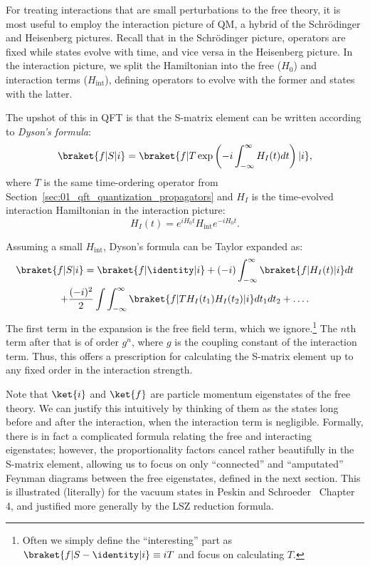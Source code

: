 For treating interactions that are small perturbations to the free theory, it is most useful to employ the interaction picture of QM, a hybrid of the Schr\"odinger and Heisenberg pictures.
Recall that in the Schr\"odinger picture, operators are fixed while states evolve with time, and vice versa in the Heisenberg picture.
In the interaction picture, we split the Hamiltonian into the free ($H_0$) and interaction terms ($H_{\mathrm{int}}$), defining operators to evolve with the former and states with the latter.

The upshot of this in QFT is that the S-matrix element can be written according to \textit{Dyson's formula}:
\begin{equation}
	\label{eq:01_qft_interactions_dysons_formula}
	\braket{f|S|i} = \braket{f|T\exp\left(-i\int_{-\infty}^\infty H_I(t)dt\right)|i},
\end{equation}
where $T$ is the same time-ordering operator from Section~\ref{sec:01_qft_quantization_propagators} and $H_I$ is the time-evolved interaction Hamiltonian in the interaction picture:
\begin{equation}
	\label{eq:01_qft_interactions_interaction_hamiltonian}
	H_I(t) = e^{iH_0t}H_{\mathrm{int}}e^{-iH_0t}.
\end{equation}

Assuming a small $H_{\mathrm{int}}$, Dyson's formula can be Taylor expanded as:
\begin{multline}
	\label{eq:01_qft_interactions_dysons_expansion}
	\braket{f|S|i} = \braket{f|\identity|i} + (-i) \int_{-\infty}^\infty \braket{f|H_I(t)|i}dt \\
	+ \frac{(-i)^2}{2} \int\int_{-\infty}^{\infty} \braket{f|T H_I(t_1)H_I(t_2)|i}dt_1dt_2 + \ldots.
\end{multline}
The first term in the expansion is the free field term, which we ignore.\footnote{Often we simply define the ``interesting'' part as $\braket{f|S-\identity|i} \equiv iT$ and focus on calculating $T$.}
The $n$th term after that is of order $g^n$, where $g$ is the coupling constant of the interaction term.
Thus, this offers a prescription for calculating the S-matrix element up to any fixed order in the interaction strength.

Note that $\ket{i}$ and $\ket{f}$ are particle momentum eigenstates of the free theory. 
We can justify this intuitively by thinking of them as the states long before and after the interaction, when the interaction term is negligible.
Formally, there is in fact a complicated formula relating the free and interacting eigenstates; however, the proportionality factors cancel rather beautifully in the S-matrix element, allowing us to focus on only ``connected'' and ``amputated'' Feynman diagrams between the free eigenstates, defined in the next section.
This is illustrated (literally) for the vacuum states in Peskin and Schroeder~\cite{Peskin:1995ev} Chapter 4, and justified more generally by the LSZ reduction formula.



